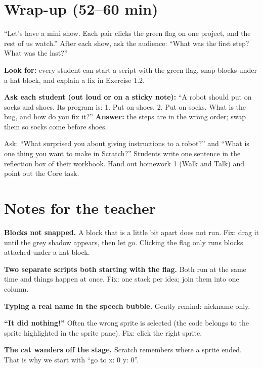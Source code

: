 \section{Wrap-up (52--60 min)}
\begin{teacherscript}
\enquote{Let's have a mini show. Each pair clicks the green flag on one project, and the rest of us watch.} After each show, ask the audience: \enquote{What was the first step? What was the last?}
\end{teacherscript}

\begin{formativecheck}
\textbf{Look for:} every student can start a script with the green flag, snap blocks under a hat block, and explain a fix in Exercise 1.2.

\textbf{Ask each student (out loud or on a sticky note):} \enquote{A robot should put on socks and shoes. Its program is: 1. Put on shoes. 2. Put on socks. What is the bug, and how do you fix it?}
\textbf{Answer:} the steps are in the wrong order; swap them so socks come before shoes.
\end{formativecheck}

\begin{reflection}
Ask: \enquote{What surprised you about giving instructions to a robot?} and \enquote{What is one thing you want to make in Scratch?} Students write one sentence in the reflection box of their workbook. Hand out homework 1 (Walk and Talk) and point out the Core task.
\end{reflection}

\section{Notes for the teacher}
\begin{commonmistakes}
  \item \textbf{Blocks not snapped.} A block that is a little bit apart does not run. Fix: drag it until the grey shadow appears, then let go. Clicking the flag only runs blocks attached under a hat block.
  \item \textbf{Two separate scripts both starting with the flag.} Both run at the same time and things happen at once. Fix: one stack per idea; join them into one column.
  \item \textbf{Typing a real name in the speech bubble.} Gently remind: nickname only.
  \item \textbf{\enquote{It did nothing!}} Often the wrong sprite is selected (the code belongs to the sprite highlighted in the sprite pane). Fix: click the right sprite.
  \item \textbf{The cat wanders off the stage.} Scratch remembers where a sprite ended. That is why we start with \enquote{go to x: 0 y: 0}.
\end{commonmistakes}

